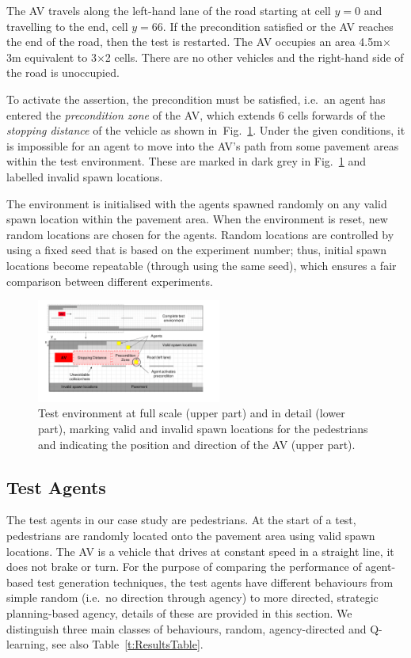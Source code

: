 \documentclass[letterpaper, 10 pt, journal, twoside]{IEEEtran}
\begin{document}
The AV travels along the left-hand lane of the road starting at cell $y=0$ and travelling to the end, cell $y=66$. If the precondition satisfied or the AV reaches the end of the road, then the test is restarted. The AV occupies an area 4.5m$\times$3m equivalent to 3$\times$2 cells. There are no other vehicles and the right-hand side of the road is unoccupied.

To activate the assertion, the precondition must be satisfied, i.e.\ an agent has entered the \textit{precondition zone} of the AV, which extends 6 cells forwards of the \textit{stopping distance} of the vehicle as shown in~Fig.~\ref{gridRoad}. Under the given conditions, it is impossible for an agent to move into the AV's path from some pavement areas within the test environment. These are marked in dark grey in Fig.~\ref{gridRoad} and labelled invalid spawn locations. 

The environment is initialised with the agents spawned randomly on any valid spawn location within the pavement area. When the environment is reset, new random locations are chosen for the agents. Random locations are controlled by using a fixed seed that is based on the experiment number; thus, initial spawn locations become repeatable (through using the same seed), which ensures a fair comparison between different experiments.

\begin{figure}[!t]
	\centering
\includegraphics[width=0.54\textwidth]{RoadLayout.pdf}
	\caption{Test environment at full scale (upper part) and in detail (lower part), marking valid and invalid spawn locations for the pedestrians and indicating the position and direction of the AV (upper part).}
	\label{gridRoad}
\end{figure}

\subsection{Test Agents}

The test agents in our case study are pedestrians. At the start of a test, pedestrians are randomly located onto the pavement area using valid spawn locations. The AV is a vehicle that drives at constant speed in a straight line, it does not brake or turn. For the purpose of comparing the performance of agent-based test generation techniques, the test agents have different behaviours from simple random (i.e.\ no direction through agency) to more directed, strategic planning-based agency, details of these are provided in this section. We distinguish three main classes of behaviours, random, agency-directed and Q-learning, see also Table~\ref{t:ResultsTable}. 
\end{document}
